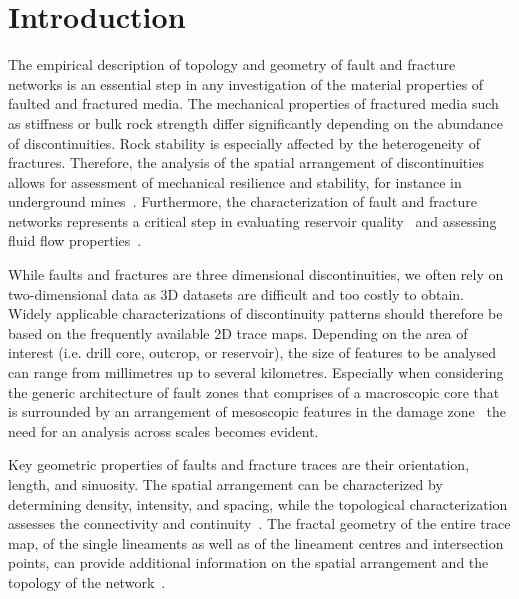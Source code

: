 \documentclass[a4paper,fleqn]{cas-sc}
\begin{document}
\maketitle

\section{Introduction}
The empirical description of topology and geometry of fault and fracture networks is an essential step in any investigation of the material properties of faulted and fractured media. The mechanical properties of fractured media such as stiffness or bulk rock strength differ significantly depending on the abundance of discontinuities. Rock stability is especially affected by the heterogeneity of fractures. Therefore, the analysis of the spatial arrangement of discontinuities allows for assessment of mechanical resilience and stability, for instance in underground mines~\citep{Wang2017, Kong2019}. Furthermore, the characterization of fault and fracture networks represents a critical step in evaluating reservoir quality~\citep{Bauer2017} and assessing fluid flow properties~\citep{Lopez1995, Gudmunsson2000}.

While faults and fractures are three dimensional discontinuities, we often rely on two-dimensional data as 3D datasets are difficult and too costly to obtain. Widely applicable characterizations of discontinuity patterns should therefore be based on the frequently available 2D trace maps. Depending on the area of interest (i.e. drill core, outcrop, or reservoir), the size of features to be analysed can range from millimetres up to several kilometres. Especially when considering the generic architecture of fault zones that comprises of a macroscopic core that is surrounded by an arrangement of mesoscopic features in the damage zone~\citep{Faulkner2010, Sutherland2012} the need for an analysis across scales becomes evident.

Key geometric properties of faults and fracture traces are their orientation, length, and sinuosity. The spatial arrangement can be characterized by determining density, intensity, and spacing, while the topological characterization assesses the connectivity and continuity~\citep{Sanderson2015}. The fractal geometry of the entire trace map, of the single lineaments as well as of the lineament centres and intersection points, can provide additional information on the spatial arrangement and the topology of the network~\citep{Roy2007}. 
\end{document}
